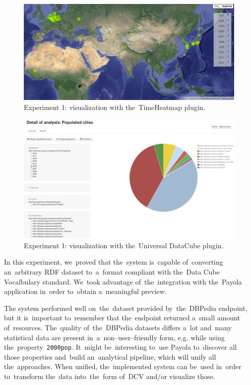 \begin{figure}
  \centering
  \includegraphics[width=140mm]{img/payola-exp-01-vis.png}
  \caption{Experiment 1: visualization with the~TimeHeatmap plugin.}
  \label{fig:payola-exp-01-vis}
\end{figure}

\begin{figure}
  \centering
  \includegraphics[width=140mm]{img/payola-exp-01-vis2.png}
  \caption{Experiment 1: visualization with the~Universal DataCube plugin.}
  \label{fig:payola-exp-01-vis2}
\end{figure}

In this experiment, we~proved that the~system is~capable of~converting an~arbitrary RDF dataset to~a~format compliant with the~Data Cube Vocalbulary 
standard. We~took advantage of~the~integration with the~Payola application in~order to~obtain a~meaningful preview.

The system performed well on~the~dataset provided by~the~DBPedia endpoint, but 
it is~important to~remember that the~endpoint returned a~small amount of~resources. The~quality of~the~DBPedia datasets differs a~lot and~many 
statistical data are present in~a~non--user--friendly form, e.g. while using the~property~\texttt{2000pop}. It~might be~interesting to~use Payola to~discover 
all those properties and~build an~analytical pipeline, which will unify all the~approaches. When unified, the~implemented system can be~used in~order to~transform the~data into~the~form of~DCV and/or visualize those.

